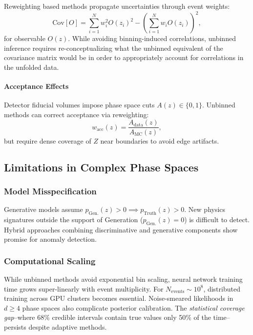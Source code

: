 Reweighting based methods propagate uncertainties through event weights:
\begin{equation}
\text{Cov}[O] = \sum_{i=1}^N w_i^2 O(z_i)^2 - \left(\sum_{i=1}^N w_i O(z_i)\right)^2,
\end{equation}
for observable \(O(z)\).
%
While avoiding binning-induced correlations, unbinned inference requires re-conceptualizing what the unbinned equivalent of the covariance matrix would be in order to appropriately account for correlations in the unfolded data.

\paragraph{Acceptance Effects}  
Detector fiducial volumes impose phase space cuts \(A(z) \in \{0,1\}\).
%
Unbinned methods can correct acceptance via reweighting:
\begin{equation}
w_{\text{acc}}(z) = \frac{A_{\text{data}}(z)}{A_{\text{MC}}(z)},
\end{equation}
but require dense coverage of \(Z\) near boundaries to avoid edge artifacts.

\subsection{Limitations in Complex Phase Spaces}  



\subsubsection{Model Misspecification}  
Generative models assume \(p_{\text{Gen.}}(z) > 0 \implies p_{\text{Truth}}(z) > 0\).
%
New physics signatures outside the support of Generation (\(p_{\text{Gen.}}(z) = 0\)) is difficult to detect.
%
Hybrid approaches combining discriminative and generative components show promise for anomaly detection.

\subsubsection{Computational Scaling}  
While unbinned methods avoid exponential bin scaling, neural network training time grows super-linearly with event multiplicity.
%
For \(N_{\text{events}} \sim 10^8\), distributed training across GPU clusters becomes essential.
%
Noise-smeared likelihoods in \(d \geq 4\) phase spaces also complicate posterior calibration.
%
The \textit{statistical coverage gap}--where 68\% credible intervals contain true values only 50\% of the time--persists despite adaptive methods.

